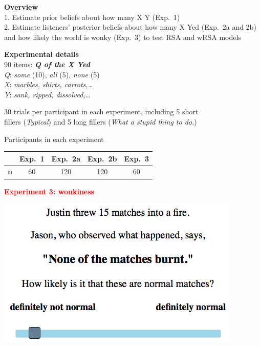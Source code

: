 \documentclass[a0,portrait]{a0poster}
\newcommand{\red}[1]{\textcolor{Red}{#1}}
\begin{document}
\begin{textblock}{7}
\begin{textblock}{3.1}
\begin{textblock}{3.25}
\end{textblock}

\large

\vspace{-1.2em}

\textbf{Overview}\\
1. Estimate prior beliefs about how many X Y (Exp.~1)\\
2. Estimate listeners' posterior beliefs about how many X Yed (Exp.~2a and 2b) and how likely the world is wonky (Exp.~3) to test RSA and wRSA models

\vspace{.25em}
\textbf{Experimental details}\\
90 items: \textbf{\emph{Q of the X Yed}}\\
 \emph{Q}: \emph{some} (10), \emph{all} (5), \emph{none} (5)\\
 \emph{X}: \emph{marbles, shirts, carrots,\dots}\\
 \emph{Y}: \emph{sank, ripped, dissolved,\dots}
 
30 trials per participant in each experiment, including 5 short \\fillers (\emph{Typical}) and 5 long fillers (\emph{What a stupid thing to do.})

Participants in each experiment

\normalsize
\begin{tabular}{l c c c c}
\toprule
 & Exp.~1 & Exp.~2a & Exp.~2b & Exp.~3 \\
\midrule
\textbf{n} & 60 & 120 & 120 & 60\\
\bottomrule
\end{tabular}

\vspace{1.2em}

\large

\textbf{\red{Experiment 3: wonkiness}}

\includegraphics[width=\textwidth]{pics/display-wonky.png}



\end{textblock}
\end{textblock}
\end{document}
